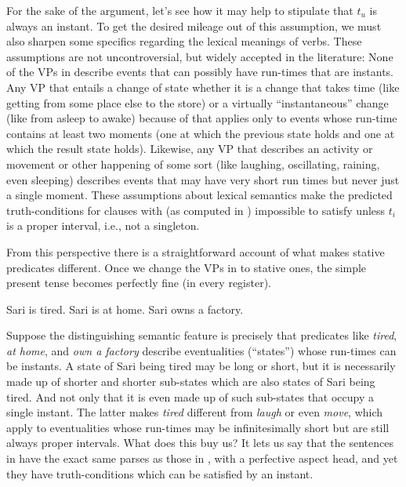 %
For the sake of the argument, let's see how it may help to stipulate that
$t_{u}$ is always an instant. To get the desired mileage out of this assumption,
we must also sharpen some specifics regarding the lexical meanings of verbs. %
%
These assumptions are not uncontroversial, but widely accepted in the
literature: None of the VPs in \LLast describe events that can possibly have
run-times that are instants. Any VP that entails a change of state \dash whether
it is a change that takes time (like getting from some place else to the store)
or a virtually ``instantaneous'' change (like from asleep to awake) \dash
because of that applies only to events whose run-time contains at least two
moments (one at which the previous state holds and one at which the result state
holds). Likewise, any VP that describes an activity or movement or other
happening of some sort (like laughing, oscillating, raining, even sleeping)
describes events that may have very short run times but never just a single
moment. These assumptions about lexical semantics make the predicted
truth-conditions for clauses with \pfv (as computed in \Last) impossible to
satisfy unless $t_{i}$ is a proper interval, i.e., not a singleton.

From this perspective there is a straightforward account of what makes stative
predicates different. Once we change the VPs in \LLast to stative ones, the
simple present tense becomes perfectly fine (in every register).

\pex
\a Sari is tired.
\a Sari is at home.
\a Sari owns a factory.
\xe

Suppose the distinguishing semantic feature is precisely that predicates like
\emph{tired}, \emph{at home}, and \emph{own a factory} describe eventualities
(``states'') whose run-times can be instants. A state of Sari being tired may be
long or short, but it is necessarily made up of shorter and shorter sub-states
which are also states of Sari being tired. And not only that \dash it is even
made up of such sub-states that occupy a single instant. The latter makes
\emph{tired} different from \emph{laugh} or even \emph{move}, which apply to
eventualities whose run-times may be infinitesimally short but are still always
proper intervals. What does this buy us? It lets us say that the sentences in
\Last have the exact same parses as those in , with a
perfective aspect head, and yet they have truth-conditions which can be
satisfied by an instant.

